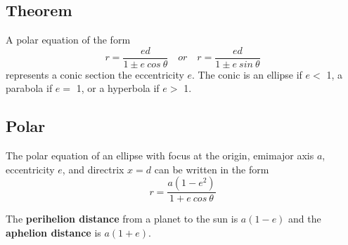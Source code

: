 \subsection*{Theorem}
A polar equation of the form
$$ r=\frac{ed}{1\pm e\:cos\:\theta} \quad or \quad r=\frac{ed}{1\pm e\:sin\:\theta} $$
represents a conic section the eccentricity $e$. The conic is an ellipse
if $e <$ 1, a parabola if $e =$ 1, or a hyperbola if $e >$ 1.

\subsection*{Polar}
The polar equation of an ellipse with focus at the origin, emimajor axis $a$,
eccentricity $e$, and directrix $x=d$ can be written in the form
$$ r=\frac{a(1-e^2)}{1+e\:cos\:\theta} $$

The \textbf{perihelion distance} from a planet to the sun is $a(1-e)$
and the \textbf{aphelion distance} is $a(1+e)$.